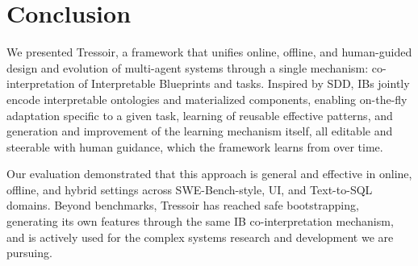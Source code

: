 \section{Conclusion}
\label{sec:conclusion}

We presented Tressoir, a framework that unifies online, offline, and human-guided design and evolution of multi-agent systems through a single mechanism: co-interpretation of Interpretable Blueprints and tasks. Inspired by SDD, IBs jointly encode interpretable ontologies and materialized components, enabling on-the-fly adaptation specific to a given task, learning of reusable effective patterns, and generation and improvement of the learning mechanism itself, all editable and steerable with human guidance, which the framework learns from over time.

Our evaluation demonstrated that this approach is general and effective in online, offline, and hybrid settings across SWE-Bench-style, UI, and Text-to-SQL domains. Beyond benchmarks, Tressoir has reached safe bootstrapping, generating its own features through the same IB co-interpretation mechanism, and is actively used for the complex systems research and development we are pursuing.